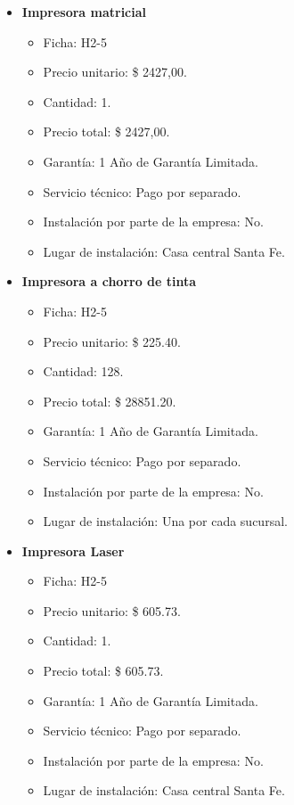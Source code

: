 \begin{itemize}
  \item \textbf{Impresora matricial}
    \begin{itemize}
      \item Ficha: H2-5
      \item Precio unitario: \$ 2427,00.
      \item Cantidad: 1.
      \item Precio total: \$ 2427,00.
      \item Garantía: 1 Año de Garantía Limitada.
      \item Servicio técnico: Pago por separado.
      \item Instalación por parte de la empresa: No.
      \item Lugar de instalación: Casa central Santa Fe.
    \end{itemize}
    
  \item \textbf{Impresora a chorro de tinta}
    \begin{itemize}
      \item Ficha: H2-5
      \item Precio unitario: \$ 225.40.
      \item Cantidad: 128.
      \item Precio total: \$ 28851.20.
      \item Garantía: 1 Año de Garantía Limitada.
      \item Servicio técnico: Pago por separado.
      \item Instalación por parte de la empresa: No.
      \item Lugar de instalación: Una por cada sucursal.
    \end{itemize}
    
  \item \textbf{Impresora Laser}
    \begin{itemize}
      \item Ficha: H2-5
      \item Precio unitario: \$ 605.73.
      \item Cantidad: 1.
      \item Precio total: \$ 605.73.
      \item Garantía: 1 Año de Garantía Limitada.
      \item Servicio técnico: Pago por separado.
      \item Instalación por parte de la empresa: No.
      \item Lugar de instalación: Casa central Santa Fe.
    \end{itemize}


\end{itemize}

